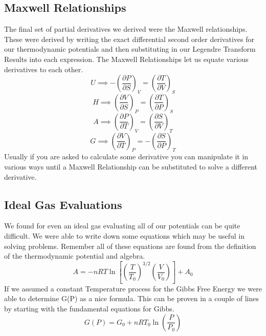 \documentclass{article}
\begin{document}
\subsection{Maxwell Relationships}
The final set of partial derivatives we derived were the Maxwell relationships. 
These were derived by writing the exact differential second order derivatives for our thermodynamic potentials and then substituting in our Legendre Transform Results into each expression. 
The Maxwell Relationships let us equate various derivatives to each other. 
\begin{equation}
U \implies 
-\left(\frac{\partial P}{\partial S}\right)_V = \left(\frac{\partial T}{\partial V}\right)_S
\end{equation}
\begin{equation}
    H \implies  \left(\frac{\partial V}{\partial S}\right)_P =
\left(\frac{\partial T}{\partial P}\right)_S
\end{equation}
\begin{equation}
    A \implies \left(\frac{\partial P}{\partial T}\right)_V = \left(\frac{\partial S}{\partial V}\right)_T
\end{equation}
\begin{equation}
    G \implies \left(\frac{\partial V}{\partial T}\right)_P = -\left(\frac{\partial S}{\partial P}\right)_T
\end{equation}
Usually if you are asked to calculate some derivative you can manipulate it in various ways until a Maxwell Relationship can be substituted to solve a different derivative. 

\subsection{Ideal Gas Evaluations}
We found for even an ideal gas evaluating all of our potentials can be quite difficult. 
We were able to write down some equations which may be useful in solving problems. 
Remember all of these equations are found from the definition of the thermodynamic potential and algebra. 
\begin{equation}
    A = -nRT \ln\left[ \left(\frac{T}{T_0} \right)^{3/2} \left(\frac{V}{V_0} \right) \right ] + A_0
\end{equation}
If we assumed a constant Temperature process for the Gibbs Free Energy we were able to determine G(P) as a nice formula.
This can be proven in a couple of lines by starting with the fundamental equations for Gibbs. 
\begin{equation}
     G(P) = G_0 + nRT_0\ln\left(\frac{P}{P_0}\right)
\end{equation}
\end{document}
